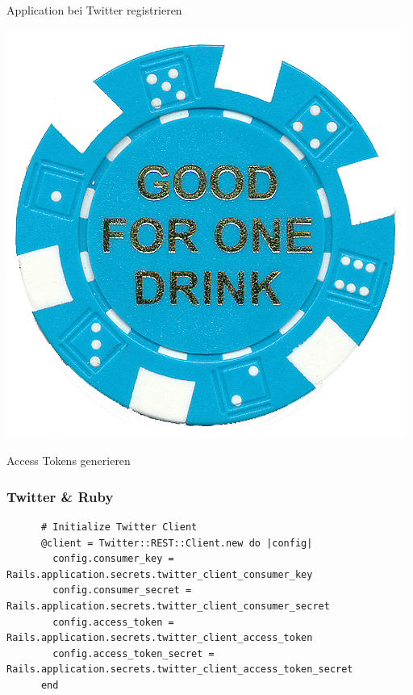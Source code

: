 \documentclass{beamer}
\begin{document}
\begin{frame}
\begin{minipage}{.2\textwidth}
  \end{minipage}%
  \hfill
  \begin{minipage}{.8\textwidth}
    Application bei Twitter registrieren \pause \\    
  \end{minipage}
  \begin{minipage}{.2\textwidth}
    \includegraphics[height=.2\textheight]{token}
  \end{minipage}%
  \hfill
  \begin{minipage}{.8\textwidth}
    Access Tokens generieren    
  \end{minipage}
\end{frame}

\begin{frame}[fragile]
  \frametitle{Twitter \& Ruby}
    \begin{lstlisting}
      # Initialize Twitter Client
      @client = Twitter::REST::Client.new do |config|
        config.consumer_key = Rails.application.secrets.twitter_client_consumer_key
        config.consumer_secret = Rails.application.secrets.twitter_client_consumer_secret
        config.access_token = Rails.application.secrets.twitter_client_access_token
        config.access_token_secret = Rails.application.secrets.twitter_client_access_token_secret
      end
    \end{lstlisting}    
\end{frame}
\end{document}
